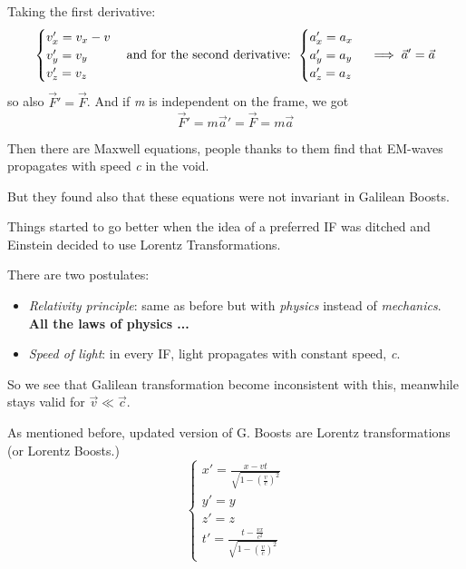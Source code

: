 \documentclass{report}
\begin{document}
Taking the first derivative:
\begin{equation}
\begin{cases}
v_{x}' = v_{x} - v \\
v_{y}' = v_{y} \\
v_{z}' = v_{z} \\
\end{cases} \text{and for the second derivative: } \\
\begin{cases}
a_{x}' = a_{x} \\
a_{y}' = a_{y}\\
a_{z}' = a_{z}
\end{cases} \implies \vec{a}' = \vec{a}
\end{equation}
so also $\vec{F}' = \vec{F}$. And if \emph{m} is independent on the frame, we got
\begin{equation}
\vec{F}'=m \vec{a}' = \vec{F} = m \vec{a}
\end{equation}
\bigskip

Then there are Maxwell equations, people thanks to them find that EM-waves propagates with speed \emph{c} in the void. \par
But they found also that these equations were not invariant in Galilean Boosts. \par
Things started to go better when the idea of a preferred IF was ditched and Einstein decided to use Lorentz Transformations.\par

There are two postulates: \par
\begin{itemize}
	\item \emph{Relativity principle}: same as before but with \emph{physics} instead of \emph{mechanics}. \textbf{All the laws of physics ...}
	\item \emph{Speed of light}: in every IF, light propagates with constant speed, \emph{c}.
\end{itemize}
So we see that Galilean transformation become inconsistent with this, meanwhile stays valid for $\vec{v} \ll \vec{c}$.\par
As mentioned before, updated version of G. Boosts are Lorentz transformations (or Lorentz Boosts.)
\begin{equation}
\begin{cases}
	x' = \frac{x-vt}{\sqrt{1-(\frac{v}{c})^{2}}} \\
	y' = y \\
	z' = z \\
	t' = \frac{t- \frac{vx}{c^{2}}}{\sqrt{1-(\frac{v}{c})^{2}}}
\end{cases}
\end{equation}
\end{document}
